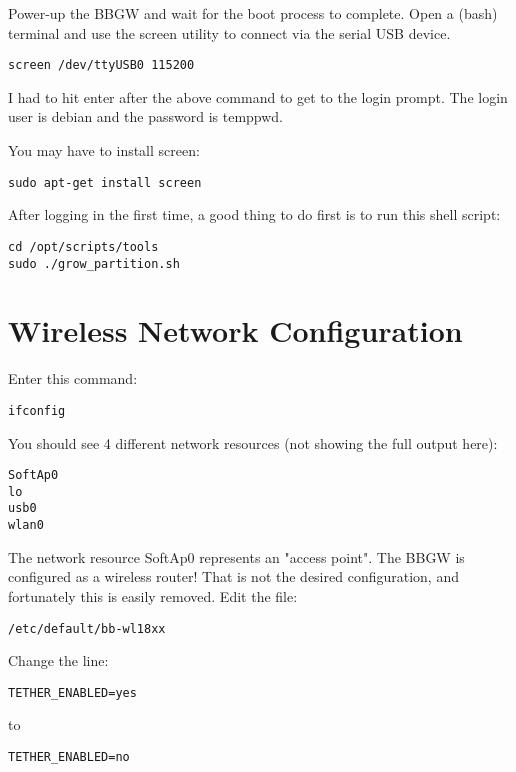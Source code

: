 Power-up the BBGW and wait for the boot process to complete.
Open a (bash) terminal and use the screen utility to connect via the serial USB 
device.

\begin{verbatim}
screen /dev/ttyUSB0 115200
\end{verbatim}

I had to hit enter after the above command to get to the login prompt.
The login user is debian and the password is temppwd.

You may have to install screen:

\begin{verbatim}
sudo apt-get install screen
\end{verbatim}

After logging in the first time, a good thing to do first is to run this shell 
script:

\begin{verbatim}
cd /opt/scripts/tools
sudo ./grow_partition.sh
\end{verbatim}

\section{Wireless Network Configuration}

Enter this command:

\begin{verbatim}
ifconfig
\end{verbatim}

You should see 4 different network resources (not showing the full output here):

\begin{verbatim}
SoftAp0
lo
usb0
wlan0
\end{verbatim}

The network resource SoftAp0 represents an "access point".
The BBGW is configured as a wireless router!
That is not the desired configuration, and fortunately this is easily removed.
Edit the file:

\begin{verbatim}
/etc/default/bb-wl18xx
\end{verbatim}

Change the line:

\begin{verbatim}
TETHER_ENABLED=yes
\end{verbatim}

to

\begin{verbatim}
TETHER_ENABLED=no
\end{verbatim}

